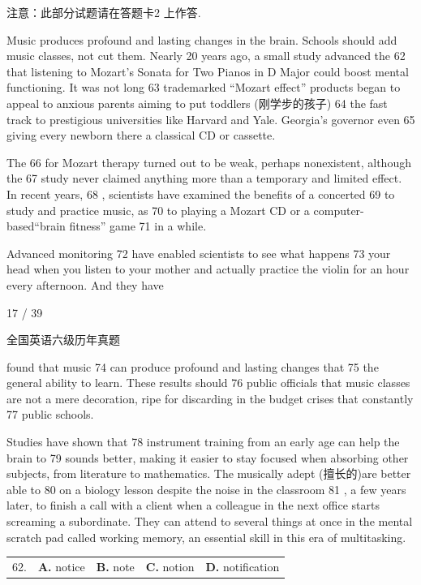 \documentclass[UTF8,11pt]{ctexart}
\begin{document}
注意：此部分试题请在答题卡2 上作答.


Music produces profound and lasting changes in the brain. Schools should add music classes, not cut them. Nearly 20 years ago, a small study advanced the 62 that listening to Mozart’s Sonata for Two Pianos in D Major could boost mental functioning. It was not long 63 trademarked “Mozart effect” products began to appeal to anxious parents aiming to put toddlers (刚学步的孩子) 64 the fast track to prestigious universities like Harvard and Yale. Georgia’s governor even 65 giving every newborn there a classical CD or cassette.


The 66 for Mozart therapy turned out to be weak, perhaps nonexistent, although the 67 study never claimed anything more than a temporary and limited effect. In recent years, 68 , scientists have examined the benefits of a concerted 69 to study and practice music, as 70 to playing a Mozart CD or a computer-based“brain fitness” game 71 in a while.


Advanced monitoring 72 have enabled scientists to see what happens 73 your head when you listen to your mother and actually practice the violin for an hour every afternoon. And they have


17 / 39


全国英语六级历年真题


found that music 74 can produce profound and lasting changes that 75 the general ability to learn. These results should 76 public officials that music classes are not a mere decoration, ripe for discarding in the budget crises that constantly 77 public schools.


Studies have shown that 78 instrument training from an early age can help the brain to 79 sounds better, making it easier to stay focused when absorbing other subjects, from literature to mathematics. The musically adept (擅长的)are better able to 80 on a biology lesson despite the noise in the classroom 81 , a few years later, to finish a call with a client when a colleague in the next office starts screaming a subordinate. They can attend to several things at once in the mental scratch pad called working memory, an essential skill in this era of multitasking.


\noindent\begin{tabularx}{\linewidth}{@{}lXXXX@{}}62. & \textbf{A.} notice & \textbf{B.} note & \textbf{C.} notion & \textbf{D.} notification\\\end{tabularx}\par
\end{document}
